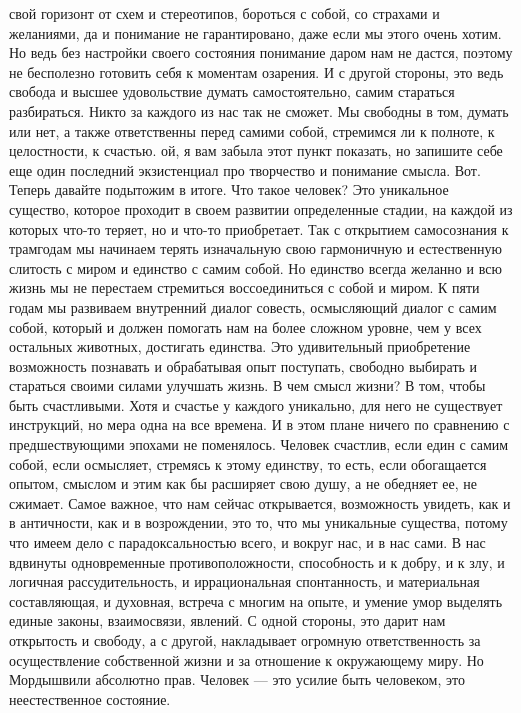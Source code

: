 свой горизонт от схем и стереотипов, бороться с собой, со страхами и желаниями,
да и понимание не гарантировано, даже если мы этого очень хотим. Но ведь без
настройки своего состояния понимание даром нам не дастся, поэтому не бесполезно
готовить себя к моментам озарения. И с другой стороны, это ведь свобода и высшее
удовольствие думать самостоятельно, самим стараться разбираться. Никто за
каждого из нас так не сможет. Мы свободны в том, думать или нет, а также
ответственны перед самими собой, стремимся ли к полноте, к целостности, к
счастью. ой, я вам забыла этот пункт показать, но запишите себе еще один
последний экзистенциал про творчество и понимание смысла. Вот. Теперь давайте
подытожим в итоге. Что такое человек? Это уникальное существо, которое проходит
в своем развитии определенные стадии, на каждой из которых что-то теряет, но и
что-то приобретает. Так с открытием самосознания к трамгодам мы начинаем терять
изначальную свою гармоничную и естественную слитость с миром и единство с самим
собой. Но единство всегда желанно и всю жизнь мы не перестаем стремиться
воссоединиться с собой и миром. К пяти годам мы развиваем внутренний диалог
совесть, осмысляющий диалог с самим собой, который и должен помогать нам на
более сложном уровне, чем у всех остальных животных, достигать единства. Это
удивительный приобретение возможность познавать и обрабатывая опыт поступать,
свободно выбирать и стараться своими силами улучшать жизнь. В чем смысл жизни? В
том, чтобы быть счастливыми. Хотя и счастье у каждого уникально, для него не
существует инструкций, но мера одна на все времена. И в этом плане ничего по
сравнению с предшествующими эпохами не поменялось. Человек счастлив, если един с
самим собой, если осмысляет, стремясь к этому единству, то есть, если
обогащается опытом, смыслом и этим как бы расширяет свою душу, а не обедняет ее,
не сжимает. Самое важное, что нам сейчас открывается, возможность увидеть, как и
в античности, как и в возрождении, это то, что мы уникальные существа, потому
что имеем дело с парадоксальностью всего, и вокруг нас, и в нас сами. В нас
вдвинуты одновременные противоположности, способность и к добру, и к злу, и
логичная рассудительность, и иррациональная спонтанность, и материальная
составляющая, и духовная, встреча с многим на опыте, и умение умор выделять
единые законы, взаимосвязи, явлений. С одной стороны, это дарит нам открытость и
свободу, а с другой, накладывает огромную ответственность за осуществление
собственной жизни и за отношение к окружающему миру. Но Мордышвили абсолютно
прав. Человек — это усилие быть человеком, это неестественное состояние.
